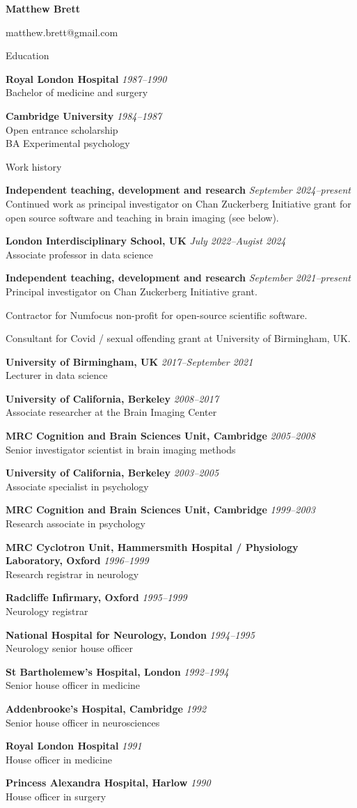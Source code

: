 \documentclass{cv}
\newcommand{\PlaceDate}[2]{{\bf #1} \hfill {\em #2} \\}
\newcommand{\PlaceDateNote}[3]{{\bf #1} \hfill {\em #2} \\#3}
\newcommand{\LIS}{London Interdisciplinary School, UK}
\newcommand{\UoB}{University of Birmingham, UK}
\newcommand{\UCB}{University of California, Berkeley}
\newcommand{\CBU}{MRC Cognition and Brain Sciences Unit, Cambridge}
\begin{document}
\nocite{*}

{\huge \bf Matthew Brett}

matthew.brett@gmail.com

\begin{cvSection}{Education}

\PlaceDate{Royal London Hospital}{1987--1990 }
Bachelor of medicine and surgery

\PlaceDateNote{Cambridge University}{1984--1987 }{
Open entrance scholarship \\
BA Experimental psychology}

\end{cvSection}

\begin{cvSection}{Work history}

    \PlaceDateNote{Independent teaching, development and research}{September 2024--present}{
    Continued work as principal investigator on Chan Zuckerberg Initiative
    grant for open source software and teaching in brain imaging (see below).}

\PlaceDateNote{\LIS}{July 2022--Augist 2024 }{
    Associate professor in data science}

\PlaceDateNote{Independent teaching, development and research}{September 2021--present}{
    Principal investigator on Chan Zuckerberg Initiative grant.

    Contractor for Numfocus non-profit for open-source scientific software.

    Consultant for Covid / sexual offending grant at \UoB.}

\PlaceDateNote{\UoB}{2017--September 2021 }{
    Lecturer in data science}

\PlaceDateNote{\UCB}{2008--2017 }{
    Associate researcher at the Brain Imaging Center}

\PlaceDateNote{\CBU}{2005--2008}{
    Senior investigator scientist in brain imaging methods}

\PlaceDateNote{\UCB}{2003--2005 }{
    Associate specialist in psychology}

\PlaceDateNote{\CBU}{1999--2003 }{
    Research associate in psychology}

\PlaceDateNote{
MRC Cyclotron Unit, Hammersmith Hospital / Physiology Laboratory, Oxford}
{1996--1999}
{Research registrar in neurology}

\PlaceDateNote{Radcliffe Infirmary, Oxford}
{1995--1999}
{Neurology registrar}

\PlaceDateNote{National Hospital for Neurology, London}{1994--1995 }{
Neurology senior house officer}

\PlaceDateNote{St Bartholemew's Hospital, London}{1992--1994 }{
Senior house officer in medicine}

\PlaceDateNote{Addenbrooke's Hospital, Cambridge}{1992 }{
Senior house officer in neurosciences}

\PlaceDateNote{Royal London Hospital}{1991 }{
House officer in medicine}

\PlaceDateNote{Princess Alexandra Hospital, Harlow}{1990 }{
House officer in surgery}

\end{cvSection}
\end{document}
